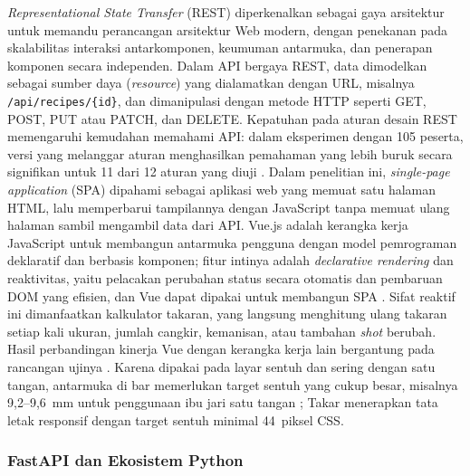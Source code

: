 \textit{Representational State Transfer} (REST) diperkenalkan \citet*{fielding2000architectural} sebagai gaya arsitektur untuk memandu perancangan arsitektur Web modern, dengan penekanan pada skalabilitas interaksi antarkomponen, keumuman antarmuka, dan penerapan komponen secara independen. Dalam API bergaya REST, data dimodelkan sebagai sumber daya (\textit{resource}) yang dialamatkan dengan URL, misalnya \texttt{/api/recipes/\{id\}}, dan dimanipulasi dengan metode HTTP seperti GET, POST, PUT atau PATCH, dan DELETE. Kepatuhan pada aturan desain REST memengaruhi kemudahan memahami API: dalam eksperimen dengan 105 peserta, versi yang melanggar aturan menghasilkan pemahaman yang lebih buruk secara signifikan untuk 11 dari 12 aturan yang diuji \citep*{bogner2023restful}. Dalam penelitian ini, \textit{single-page application} (SPA) dipahami sebagai aplikasi web yang memuat satu halaman HTML, lalu memperbarui tampilannya dengan JavaScript tanpa memuat ulang halaman sambil mengambil data dari API. Vue.js adalah kerangka kerja JavaScript untuk membangun antarmuka pengguna dengan model pemrograman deklaratif dan berbasis komponen; fitur intinya adalah \textit{declarative rendering} dan reaktivitas, yaitu pelacakan perubahan status secara otomatis dan pembaruan DOM yang efisien, dan Vue dapat dipakai untuk membangun SPA \citep*{vuejs2026introduction}. Sifat reaktif ini dimanfaatkan kalkulator takaran, yang langsung menghitung ulang takaran setiap kali ukuran, jumlah cangkir, kemanisan, atau tambahan \textit{shot} berubah. Hasil perbandingan kinerja Vue dengan kerangka kerja lain bergantung pada rancangan ujinya \citep*{lipski2021comparative, bogusz2024performance}. Karena dipakai pada layar sentuh dan sering dengan satu tangan, antarmuka di bar memerlukan target sentuh yang cukup besar, misalnya 9,2--9,6~mm untuk penggunaan ibu jari satu tangan \citep*{parhi2006target}; Takar menerapkan tata letak responsif dengan target sentuh minimal 44~piksel CSS.

\subsubsection{FastAPI dan Ekosistem Python}
\label{subsubsec:fastapi}


